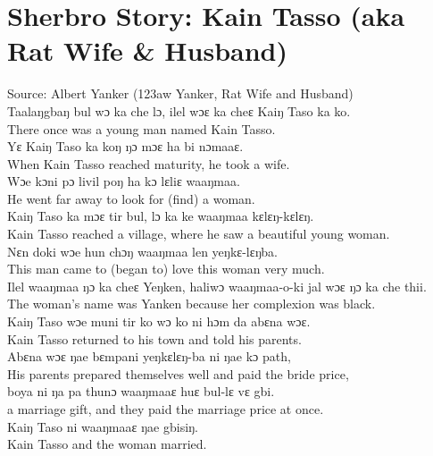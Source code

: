 \chapter{Sherbro Story: Kain Tasso (aka Rat Wife \& Husband)}
\label{app:d}

Source: Albert Yanker (123aw Yanker, Rat Wife and Husband)\\

Taalaŋgbaŋ bul wɔ ka che lɔ, ilel wɔɛ ka cheɛ Kaiŋ Taso ka ko.\\
There once was a young man named Kain Tasso.\\

Yɛ Kaiŋ Taso ka koŋ ŋɔ mɔɛ ha bi nɔmaaɛ.\\
When Kain Tasso reached maturity, he took a wife.\\

Wɔe kɔni pɔ livil poŋ ha kɔ lɛliɛ waaŋmaa.\\
He went far away to look for (find) a woman.\\

Kaiŋ Taso ka mɔɛ tir bul, lɔ ka ke waaŋmaa kɛlɛŋ-kɛlɛŋ.\\
Kain Tasso reached a village, where he saw a beautiful young woman.\\

Nɛn doki wɔe hun chɔŋ waaŋmaa len yeŋkɛ-lɛŋba.\\
This man came to (began to) love this woman very much.\\

Ilel waaŋmaa ŋɔ ka cheɛ Yeŋken, haliwɔ waaŋmaa-o-ki jal wɔɛ ŋɔ ka che thii.\\
The woman’s name was Yanken because her complexion was black.\\

Kaiŋ Taso wɔe muni tir ko wɔ ko ni hɔm da abɛna wɔɛ.\\
Kain Tasso returned to his town and told his parents.\\

Abɛna wɔɛ ŋae bɛmpani yeŋkɛlɛŋ-ba ni ŋae kɔ path,\\
His parents prepared themselves well and paid the bride price,\\

boya ni ŋa pa thunɔ waaŋmaaɛ huɛ bul-lɛ vɛ gbi.\\
a marriage gift, and they paid the marriage price at once.\\

Kaiŋ Taso ni waaŋmaaɛ ŋae gbisiŋ.\\
Kain Tasso and the woman married.\\

